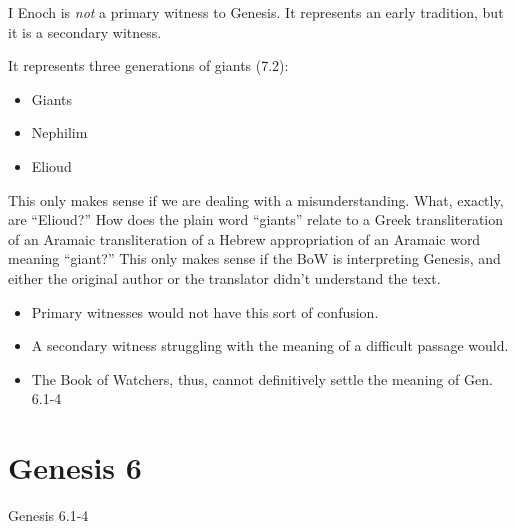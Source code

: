 \documentclass{beamer}
\begin{document}
\begin{frame}
  I Enoch is \emph{not} a primary witness to Genesis.
  It represents an early tradition, but it is a secondary witness.
\end{frame}

\begin{frame}
  It represents three generations of giants (7.2):\pause
  \begin{itemize}
	\item Giants\pause
	\item Nephilim\pause
	\item Elioud
  \end{itemize}
\end{frame}

\begin{frame}
  This only makes sense if we are dealing with a misunderstanding.
  What, exactly, are ``Elioud?''
  How does the plain word ``giants'' relate to a Greek transliteration of an Aramaic transliteration of a Hebrew appropriation of an Aramaic word meaning ``giant?''
  This only makes sense if the BoW is interpreting Genesis, and either the original author or the translator didn't understand the text.
\end{frame}

\begin{frame}
  \begin{itemize}
	\item Primary witnesses would not have this sort of confusion.\pause
	\item A secondary witness struggling with the meaning of a difficult passage would.\pause
	\item The Book of Watchers, thus, cannot definitively settle the meaning of Gen. 6.1-4
  \end{itemize}
\end{frame}

\section{Genesis 6}

\begin{frame}
  \huge{Genesis 6.1-4}
\end{frame}
\end{document}
